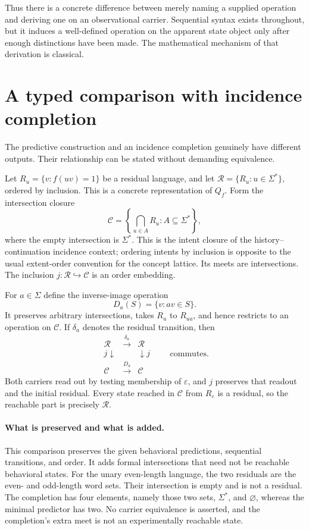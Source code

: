 \documentclass[11pt]{article}
\theoremstyle{remark}
\newcommand{\eps}{\varepsilon}
\newcommand{\R}{\mathcal R}
\newcommand{\C}{\mathcal C}
\begin{document}
Thus there is a concrete difference between merely naming a supplied operation and deriving one on an observational carrier. Sequential syntax exists throughout, but it induces a well-defined operation on the apparent state object only after enough distinctions have been made. The mathematical mechanism of that derivation is classical.

\section{A typed comparison with incidence completion}
\label{sec:incidence}

The predictive construction and an incidence completion genuinely have different outputs. Their relationship can be stated without demanding equivalence.

Let $R_u=\{v:f(uv)=1\}$ be a residual language, and let $\R=\{R_u:u\in\Sigma^*\}$, ordered by inclusion. This is a concrete representation of $Q_f$. Form the intersection closure
\[
 \C=\left\{\bigcap_{u\in A}R_u:A\subseteq\Sigma^*\right\},
\]
where the empty intersection is $\Sigma^*$. This is the intent closure of the history--continuation incidence context; ordering intents by inclusion is opposite to the usual extent-order convention for the concept lattice. Its meets are intersections. The inclusion $j:\R\hookrightarrow\C$ is an order embedding.

For $a\in\Sigma$ define the inverse-image operation
\[
 D_a(S)=\{v:av\in S\}.
\]
It preserves arbitrary intersections, takes $R_u$ to $R_{ua}$, and hence restricts to an operation on $\C$. If $\delta_a$ denotes the residual transition, then
\[
 \begin{array}{ccc}
 \R&\xrightarrow{\delta_a}&\R\\
 {\scriptstyle j}\downarrow&&\downarrow{\scriptstyle j}\\
 \C&\xrightarrow{D_a}&\C
 \end{array}
 \qquad\text{commutes.}
\]
Both carriers read out by testing membership of $\eps$, and $j$ preserves that readout and the initial residual. Every state reached in $\C$ from $R_\eps$ is a residual, so the reachable part is precisely $\R$.

\paragraph{What is preserved and what is added.}
This comparison preserves the given behavioral predictions, sequential transitions, and order. It adds formal intersections that need not be reachable behavioral states. For the unary even-length language, the two residuals are the even- and odd-length word sets. Their intersection is empty and is not a residual. The completion has four elements, namely those two sets, $\Sigma^*$, and $\varnothing$, whereas the minimal predictor has two. No carrier equivalence is asserted, and the completion's extra meet is not an experimentally reachable state.
\end{document}
